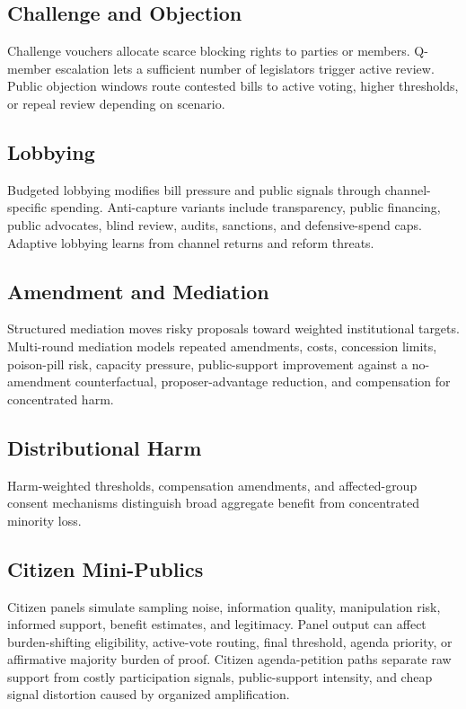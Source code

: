 \documentclass[manuscript]{acmart}
\begin{document}
\subsection{Challenge and Objection}

Challenge vouchers allocate scarce blocking rights to parties or members. Q-member escalation lets a sufficient number of legislators trigger active review. Public objection windows route contested bills to active voting, higher thresholds, or repeal review depending on scenario.

\subsection{Lobbying}

Budgeted lobbying modifies bill pressure and public signals through channel-specific spending. Anti-capture variants include transparency, public financing, public advocates, blind review, audits, sanctions, and defensive-spend caps. Adaptive lobbying learns from channel returns and reform threats.

\subsection{Amendment and Mediation}

Structured mediation moves risky proposals toward weighted institutional targets. Multi-round mediation models repeated amendments, costs, concession limits, poison-pill risk, capacity pressure, public-support improvement against a no-amendment counterfactual, proposer-advantage reduction, and compensation for concentrated harm.

\subsection{Distributional Harm}

Harm-weighted thresholds, compensation amendments, and affected-group consent mechanisms distinguish broad aggregate benefit from concentrated minority loss.

\subsection{Citizen Mini-Publics}

Citizen panels simulate sampling noise, information quality, manipulation risk, informed support, benefit estimates, and legitimacy. Panel output can affect burden-shifting eligibility, active-vote routing, final threshold, agenda priority, or affirmative majority burden of proof. Citizen agenda-petition paths separate raw support from costly participation signals, public-support intensity, and cheap signal distortion caused by organized amplification.
\end{document}
